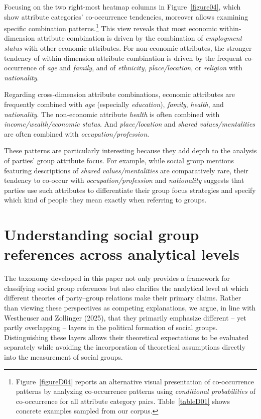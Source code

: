 \documentclass[12pt]{article}
\begin{document}
Focusing on the two right-most heatmap columns in Figure~\ref{figure04}, which show attribute categories' co-occurrence tendencies, moreover allows examining specific combination patterns.\footnote{Figure~\ref{figureD04} reports an alternative visual presentation of co-occurrence patterns
  by analyzing co-occurrence patterns using \emph{conditional probabilities} of co-occurrence for all attribute category pairs.
  Table~\ref{tableD01} shows concrete examples sampled from our corpus.}
This view reveals that most economic within-dimension attribute combination is driven by the combination of \emph{employment status} with other economic attributes.
For non-economic attributes, the stronger tendency of within-dimension attribute combination is driven by the frequent co-occurrence of \emph{age} and \emph{family}, and of \emph{ethnicity}, \emph{place/location}, or \emph{religion} with \emph{nationality}.

Regarding cross-dimension attribute combinations, economic attributes are frequently combined with \emph{age} (especially \emph{education}), \emph{family}, \emph{health}, and \emph{nationality}.
The non-economic attribute \emph{health} is often combined with \emph{income/wealth/economic status}.
And \emph{place/location} and \emph{shared values/mentalities} are often combined with \emph{occupation/profession}.

These patterns are particularly interesting because they add depth to the analysis of parties' group attribute focus.
For example, while social group mentions featuring descriptions of \emph{shared values/mentalities} are comparatively rare, their tendency to co-occur with \emph{occupation/profession} and \emph{nationality} suggests that parties use such attributes to differentiate their group focus strategies and specify which kind of people they mean exactly when referring to groups.

\section{Understanding social group references across analytical levels}\label{understanding-social-group-references-across-analytical-levels}

The taxonomy developed in this paper not only provides a framework for classifying social group references but also clarifies the analytical level at which different theories of party--group relations make their primary claims.
Rather than viewing these perspectives as competing explanations, we argue, in line with Westheuser and Zollinger (2025), that they primarily emphasize different -- yet partly overlapping -- layers in the political formation of social groups.
Distinguishing these layers allows their theoretical expectations to be evaluated separately while avoiding the incorporation of theoretical assumptions directly into the measurement of social groups.
\end{document}
